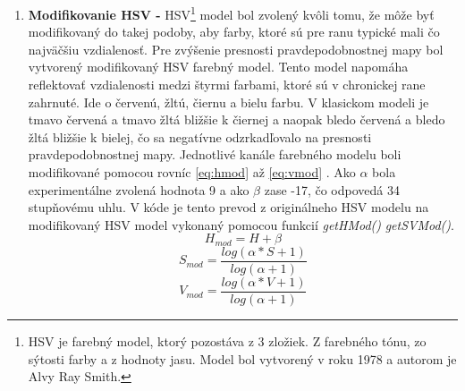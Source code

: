 \begin{enumerate}
    \item \textbf{Modifikovanie HSV -} HSV\footnote{HSV je farebný model, ktorý pozostáva z 3 zložiek. Z farebného tónu, zo sýtosti farby a z hodnoty jasu. Model bol vytvorený v roku 1978 a autorom je Alvy Ray Smith.\cite{uF1voTq6ULHlwdRU}} model bol zvolený kvôli tomu, že môže byť modifikovaný do takej podoby, aby farby, ktoré sú pre ranu typické mali čo najväčšiu vzdialenosť. Pre zvýšenie presnosti pravdepodobnostnej mapy bol vytvorený modifikovaný HSV farebný model. Tento model napomáha reflektovať vzdialenosti medzi štyrmi farbami, ktoré sú v chronickej rane zahrnuté. Ide o červenú, žltú, čiernu a bielu farbu. V klasickom modeli je tmavo červená a tmavo žltá bližšie k čiernej a naopak bledo červená a bledo žltá bližšie k bielej, čo sa negatívne odzrkadľovalo na presnosti pravdepodobnostnej mapy. Jednotlivé kanále farebného modelu boli modifikované pomocou rovníc \ref{eq:hmod} až \ref{eq:vmod} \cite{AHMADFAUZI201574}. Ako $\alpha$ bola experimentálne zvolená hodnota 9 a ako $\beta$ zase -17, čo odpovedá 34 stupňovému uhlu. V kóde je tento prevod z originálneho HSV modelu na modifikovaný HSV model vykonaný pomocou funkcií \textit{getHMod()} \textit{getSVMod()}.
    \begin{equation}
    \label{eq:hmod}
    H_{mod} = H + \beta
    \end{equation}
    \begin{equation}
    \label{eq:smod}
    S_{mod} = \frac{log(\alpha * S + 1)}{log(\alpha + 1)}
    \end{equation}
    \begin{equation}
    \label{eq:vmod}
    V_{mod} = \frac{log(\alpha * V + 1)}{log(\alpha + 1)}
    \end{equation}
    

\end{enumerate}
